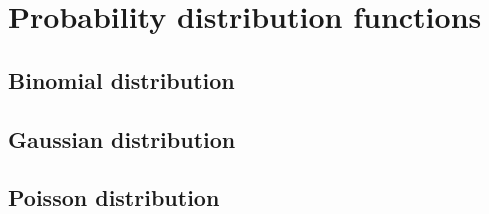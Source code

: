 \section{Probability distribution functions}

	\subsection{Binomial distribution}
	
	\subsection{Gaussian distribution}
	
	\subsection{Poisson distribution}
